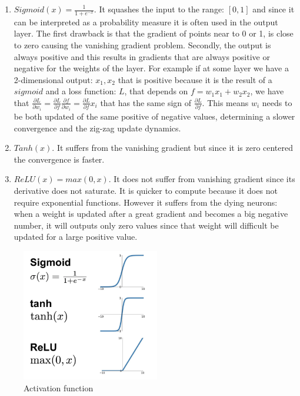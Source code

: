 \documentclass[LaM,binding=0.6cm]{sapthesis}
\begin{document}
\begin{enumerate}
\item $Sigmoid(x)=\frac{1}{1+e^{-x}}$. It squashes the input to the range: $[0,1]$ and since it can be interpreted as a probability measure it is often used in the output layer. The first drawback is that the gradient of points near to 0 or 1,  is close to zero causing the vanishing gradient problem. Secondly, the output is always positive and this results in gradients that are always positive or negative for the weights of the layer. For example if at some layer we have a 2-dimensional output: $x_1,x_2$ that is positive because it is the result of a $sigmoid$ and a loss function: $L$, that depends on $f=w_1x_1+w_2x_2$, we have that $\frac{\partial L}{\partial w_i}=\frac{\partial L}{\partial f}\frac{\partial f}{\partial w_i}=\frac{\partial L}{\partial f}x_i$ that has the same sign of $\frac{\partial L}{\partial f}$. This means $w_i$ needs to be both updated of the same positive of negative values, determining a slower convergence and the zig-zag update dynamics.
\item $Tanh(x)$. It suffers from the vanishing gradient but since it is zero centered the convergence is faster.
\item $ReLU(x)=max(0,x)$. It does not suffer from vanishing gradient since its derivative does not saturate. It is quicker to compute because it does not require exponential functions. However it suffers from the dying neurons: when a weight is updated after a great gradient and becomes a big negative number, it will outputs only zero values since that weight will difficult be updated for a large positive value.
\end{enumerate}
\begin{figure}[H]  \centering
    \includegraphics[width=60mm,scale=0.7]{actfun}
    \caption{Activation function }
    \label{fig:actfun}
\end{figure}
\end{document}

